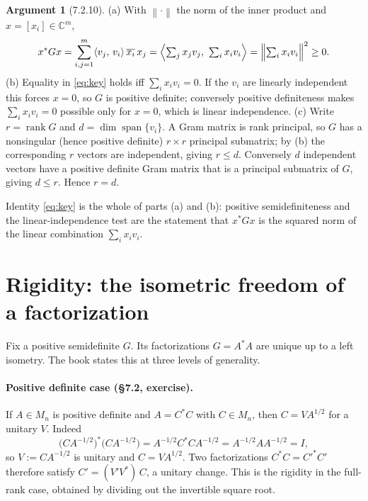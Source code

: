 \documentclass[11pt]{article}
\newcommand{\M}{M}
\newcommand{\norm}[1]{\left\lVert #1\right\rVert}
\newcommand{\inner}[2]{\langle #1,\,#2\rangle}
\newcommand{\C}{\mathbb C}
\newcommand{\adj}{^{*}}
\DeclareMathOperator{\rank}{rank}
\DeclareMathOperator{\spann}{span}
\theoremstyle{definition}
\newtheorem{argument}[theorem]{Argument}
\begin{document}
\begin{argument}[7.2.10]
(a) With $\norm{\cdot}$ the norm of the inner product and $x=[x_i]\in\C^m$,
\begin{equation}\label{eq:key}
  x\adj Gx
  =\sum_{i,j=1}^{m}\inner{v_j}{v_i}\,\overline{x_i}\,x_j
  =\Bigl\langle\textstyle\sum_j x_j v_j,\ \sum_i x_i v_i\Bigr\rangle
  =\Bigl\|\textstyle\sum_{i} x_i v_i\Bigr\|^2\ge 0 .
\end{equation}
(b) Equality in \eqref{eq:key} holds iff $\sum_i x_i v_i=0$.  If the $v_i$ are
linearly independent this forces $x=0$, so $G$ is positive definite; conversely
positive definiteness makes $\sum_i x_i v_i=0$ possible only for $x=0$, which is
linear independence.
(c) Write $r=\rank G$ and $d=\dim\spann\{v_i\}$.  A Gram matrix is rank principal,
so $G$ has a nonsingular (hence positive definite) $r\times r$ principal submatrix;
by (b) the corresponding $r$ vectors are independent, giving $r\le d$.  Conversely
$d$ independent vectors have a positive definite Gram matrix that is a principal
submatrix of $G$, giving $d\le r$.  Hence $r=d$.
\end{argument}

Identity \eqref{eq:key} is the whole of parts (a) and (b): positive
semidefiniteness and the linear-independence test are the statement that
$x\adj Gx$ is the squared norm of the linear combination $\sum_i x_i v_i$.

\section{Rigidity: the isometric freedom of a factorization}

Fix a positive semidefinite $G$.  Its factorizations $G=A\adj A$ are unique up to
a left isometry.  The book states this at three levels of generality.

\paragraph{Positive definite case (\S7.2, exercise).}
If $A\in\M_n$ is positive definite and $A=C\adj C$ with $C\in\M_n$, then
$C=V A^{1/2}$ for a unitary $V$.  Indeed
\[
  \bigl(CA^{-1/2}\bigr)\adj\bigl(CA^{-1/2}\bigr)
  =A^{-1/2}C\adj C A^{-1/2}
  =A^{-1/2}AA^{-1/2}=I,
\]
so $V:=CA^{-1/2}$ is unitary and $C=VA^{1/2}$.  Two factorizations $C\adj C=C'^{*}C'$
therefore satisfy $C'=(V'V\adj)\,C$, a unitary change.  This is the rigidity in the
full-rank case, obtained by dividing out the invertible square root.
\end{document}
